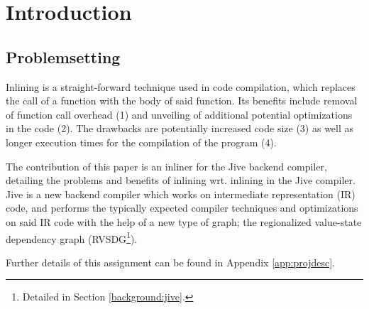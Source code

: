 
\section{Introduction}

\subsection{Problemsetting}


Inlining is a straight-forward technique used in code compilation, which
replaces the call of a function with the body of said function. Its benefits
include removal of function call overhead (1) and unveiling of additional
potential optimizations in the code (2). The drawbacks are potentially increased
code size (3) as well as longer execution times for the compilation of the
program (4).

The contribution of this paper is an inliner for the Jive
backend compiler, detailing the problems and benefits of inlining wrt. inlining
in the Jive compiler. Jive is a new backend compiler which works on intermediate
representation (IR) code, and performs the typically expected compiler
techniques and optimizations on said IR code with the help of a new type of
graph; the regionalized value-state dependency graph (RVSDG\footnote{Detailed in
Section \ref{background:jive}.}).

Further details of this assignment can be found in Appendix
\ref{app:projdesc}.
